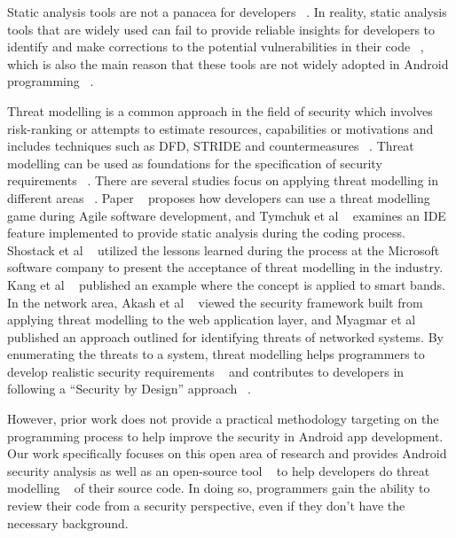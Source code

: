 Static analysis tools are not a panacea for developers ~\cite{thomas2016questions}. In reality, static analysis tools that are widely used can fail to provide reliable insights for developers to identify and make corrections to the potential vulnerabilities in their code ~\cite{xiao2014social, xiao2014social}, which is also the main reason that these tools are not widely adopted in Android programming ~\cite{reaves2017mo, yang2019towards}. 

Threat modelling is a common approach in the field of security which involves risk-ranking or attempts to estimate resources, capabilities or motivations and includes techniques such as DFD, STRIDE and countermeasures ~\cite{shostack2008experiences}. Threat modelling can be used as foundations for the specification of security requirements ~\cite{myagmar2005threat}. There are several studies focus on applying threat modelling in different areas ~\cite{oladimeji2006security}.  Paper ~\cite{rygge2019security} proposes how developers can use a threat modelling game during Agile software development, and Tymchuk et al ~\cite{tymchuk2018jit} examines an IDE feature implemented to provide static analysis during the coding process. Shostack et al ~\cite{shostack2008experiences} utilized the lessons learned during the process at the Microsoft software company to present the acceptance of threat modelling in the industry. Kang et al ~\cite{kang2018trustworthy} published an example where the concept is applied to smart bands. In the network area, Akash et al ~\cite{shrivastava2008approach} viewed the security framework built from applying threat modelling to the web application layer, and Myagmar et al ~\cite{myagmar2005threat} published an approach outlined for identifying threats of networked systems. By enumerating the threats to a system, threat modelling helps programmers to develop realistic security requirements ~\cite{myagmar2005threat} and contributes to developers in following a “Security by Design” approach ~\cite{reskiconception}.

However,  prior work does not provide a practical methodology targeting on the programming process to help improve the security in Android app development. Our work specifically focuses on this open area of research and provides Android security analysis as well as an open-source tool ~\cite{gao2018poster} to help developers do threat modelling ~\cite{harris2012privacy} of their source code.  In doing so, programmers gain the ability to review their code from a security perspective, even if they don’t have the necessary background.
